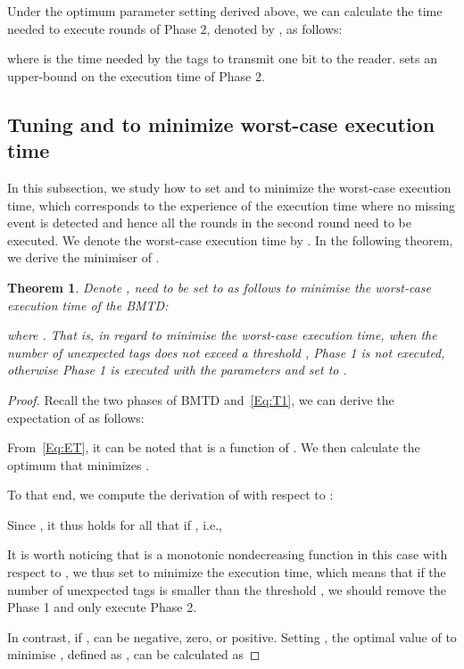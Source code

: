 \documentclass[10pt, twocolumn]{IEEEtran}
\newtheorem{theorem}{Theorem}
\begin{document}
Under the optimum parameter setting derived above, we can calculate the time needed to execute  rounds of Phase 2, denoted by , as follows:

where  is the time needed by the tags to transmit one bit to the reader.  sets an upper-bound on the execution time of Phase 2.



\subsection{Tuning  and  to minimize worst-case execution time}
\label{sec:parameter_global}

In this subsection, we study how to set  and  to minimize the worst-case execution time, which corresponds to the experience of the execution time where no missing event is detected and hence all the  rounds in the second round need to be executed. We denote the worst-case execution time by . In the following theorem, we derive the minimiser of .


\begin{theorem}
\label{Lem:Par_I}
Denote ,  need to be set to  as follows to minimise the worst-case execution time of the BMTD:

where . That is, in regard to minimise the worst-case execution time, when the number of unexpected tags does not exceed a threshold , Phase 1 is not executed, otherwise Phase 1 is executed with the parameters  and  set to .
\end{theorem}

\begin{proof}
Recall the two phases of BMTD and~\eqref{Eq:T1}, we can derive the expectation of  as follows:

From~\eqref{Eq:ET}, it can be noted that  is a function of . We then calculate the optimum  that minimizes .
\begin{comment}
It is easy to check that

Let , we have

\end{comment}
To that end, we compute the derivation of  with respect to :

Since , it thus holds for all  that  if , i.e.,

It is worth noticing that  is a monotonic nondecreasing function in this case with respect to , we thus set  to minimize the execution time, which means that if the number of unexpected tags is smaller than the threshold , we should remove the Phase 1 and only execute Phase 2.

In contrast, if ,  can be negative, zero, or positive.
Setting , the optimal value of  to minimise , defined as , can be calculated as

\begin{comment}
 Let , we obtain

\end{comment}
\end{proof}
\end{document}
